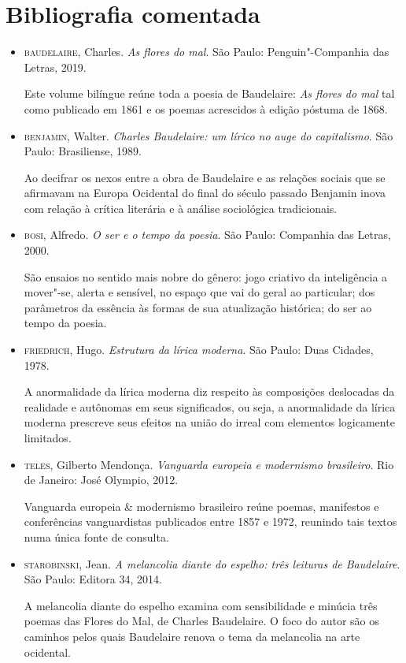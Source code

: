 \documentclass[12pt]{extarticle}
\begin{document}
\section{Bibliografia comentada}

\begin{itemize}
\item\textsc{baudelaire}, Charles. \textit{As flores do mal}. São Paulo:
Penguin"-Companhia das Letras, 2019.

Este volume bilíngue reúne toda a poesia de Baudelaire: \textit{As flores do mal}
tal como publicado em 1861 e os poemas acrescidos à edição póstuma de
1868.

\item\textsc{benjamin}, Walter. \textit{Charles Baudelaire: um lírico no auge do
capitalismo}. São Paulo: Brasiliense, 1989.

Ao decifrar os nexos entre a obra de Baudelaire e as relações sociais
que se afirmavam na Europa Ocidental do final do século passado Benjamin
inova com relação à crítica literária e à análise sociológica
tradicionais.

\item\textsc{bosi}, Alfredo. \textit{O ser e o tempo da poesia}. São Paulo: Companhia
das Letras, 2000.

São ensaios no sentido mais nobre do gênero: jogo criativo da
inteligência a mover"-se, alerta e sensível, no espaço que vai do geral
ao particular; dos parâmetros da essência às formas de sua atualização
histórica; do ser ao tempo da poesia.

\item\textsc{friedrich}, Hugo. \textit{Estrutura da lírica moderna}. São Paulo: Duas
Cidades, 1978.

A anormalidade da lírica moderna diz respeito às composições deslocadas
da realidade e autônomas em seus significados, ou seja, a anormalidade
da lírica moderna prescreve seus efeitos na união do irreal com
elementos logicamente limitados.

\item\textsc{teles}, Gilberto Mendonça. \textit{Vanguarda europeia e modernismo
brasileiro}. Rio de Janeiro: José Olympio, 2012.

Vanguarda europeia \& modernismo brasileiro reúne poemas, manifestos e
conferências vanguardistas publicados entre 1857 e 1972, reunindo tais
textos numa única fonte de consulta.

\item\textsc{starobinski}, Jean. \textit{A melancolia diante do espelho: três leituras de Baudelaire}. São Paulo: Editora 34, 2014.

A melancolia diante do espelho examina com sensibilidade e minúcia três
poemas das Flores do Mal, de Charles Baudelaire. O foco do autor são os
caminhos pelos quais Baudelaire renova o tema da melancolia na arte
ocidental.
\end{itemize}
\end{document}
